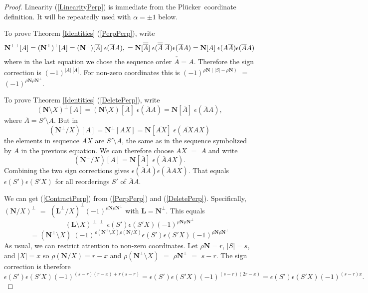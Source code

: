 \documentclass[12pt]{article}
\theoremstyle{definition}
\newcommand{\scomp}[1]{\ensuremath{\overline{#1}}}
\newcommand{\Rank}{{\rho}}%
\newcommand{\Card}[1]{\ensuremath{{\left|#1\right|}}}
\newcommand{\ext}[1]{\ensuremath{\mathbf{#1}}}
\newcommand{\Plucker}{Pl\"{u}cker\ }
\begin{document}
\begin{proof}
Linearity (\ref{LinearityPerp}) is immediate from the \Plucker coordinate
definition.  It will be repeatedly used with $\alpha = \pm 1$ below.

To prove Theorem \ref{Identities} (\ref{PerpPerp}), write
\begin{equation*}
\ext{N}^{\perp\perp}[A] = (\ext{N}^\perp)^\perp[A] 
                  = (\ext{N}^\perp)[\scomp{A}]\;\epsilon(\scomp{A} A),\\
= \ext{N}[\scomp{\scomp{A}}]\;
\epsilon(\scomp{\scomp{A}}\;\scomp{A})\epsilon(\scomp{A} A)\\
= \ext{N}[A]\;
\epsilon(A\scomp{A})\epsilon(\scomp{A} A)
\end{equation*}
where in the last equation we chose the sequence order $\scomp{\scomp{A}}=A$.
Therefore the sign correction is 
$(-1)^{|A|\;|\scomp{A}|}$.
For 
non-zero coordinates this is 
$(-1)^{\rho\ext{N}(\Card{S}-\rho\ext{N})}$ $=$
$(-1)^{\rho\ext{N}\rho\ext{N}^\perp}$.

To prove Theorem \ref{Identities} (\ref{DeletePerp}), write
\begin{equation*}
(\ext{N}\setminus X)^\perp[A] = 
(\ext{N}\setminus X)[\scomp{A}]\;\epsilon(\scomp{A}A)=
                          \ext{N}[\scomp{A}]\;\epsilon(\scomp{A}A),
\end{equation*}
where $\scomp{A}=S'\setminus A$.  But in 
\begin{equation*}
(\ext{N}^\perp/X)[A] = \ext{N}^\perp[AX] = \ext{N}[\scomp{AX}]\;
                  \epsilon(\scomp{AX}AX)
\end{equation*}
the elements in sequence 
$\scomp{AX}$ 
are $S'\setminus A$, the
same as in the sequence symbolized by $\scomp{A}$ in the previous equation.
We can therefore choose $\scomp{AX}$ $=$ $\scomp{A}$ and write
\begin{equation*}
(\ext{N}^\perp/X)[A] = \ext{N}[\scomp{A}]\;
                  \epsilon(\scomp{A}AX).
\end{equation*}
Combining the two sign corrections gives 
$\epsilon(\scomp{A}A)\epsilon(\scomp{A}AX)$.  That equals
$\epsilon(S')\epsilon(S'X)$ for all reorderings
$S'$ of $\scomp{A}A$.

We can get (\ref{ContractPerp}) from (\ref{PerpPerp}) and (\ref{DeletePerp}).
Specifically, $(\ext{N}/X)^\perp$ $=$ 
$(\ext{L}^\perp/X)^\perp(-1)^{\Rank{\ext{N}}\Rank{\ext{N}^\perp}}$ with
$\ext{L}=\ext{N}^\perp$.  This equals
\[
(\ext{L}\setminus X)^{\perp\perp}\;
   \epsilon(S')\epsilon(S'X)(-1)^{\Rank{\ext{N}}\Rank{\ext{N}^\perp}}
\]
\[
= (\ext{N}^\perp\setminus X)\;
(-1)^{\rho(\ext{N}^\perp\setminus X)\rho(\ext{N}/X)}
   \epsilon(S')\epsilon(S'X)(-1)^{\Rank{\ext{N}}\Rank{\ext{N}^\perp}}
\]
As usual, we can restrict attention to non-zero coordinates.
Let $\rho \ext{N}=r$, $\Card{S}=s$, and $\Card{X}=x$ so $\rho(\ext{N}/X)=r-x$
and $\rho(\ext{N}^\perp\setminus X)$ $=$ $\rho\ext{N}^\perp$ $=$ $s-r$. The sign
correction is therefore
\[
   \epsilon(S')\epsilon(S'X)(-1)^{(s-r)(r-x)+r(s-r)}=
   \epsilon(S')\epsilon(S'X)(-1)^{(s-r)(2r-x)}=   
   \epsilon(S')\epsilon(S'X)(-1)^{(s-r)x}.
\]


\end{proof}
\end{document}
